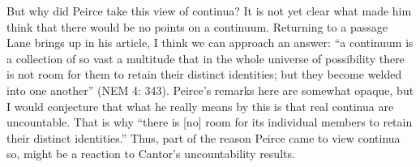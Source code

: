 But why did Peirce take this view of continua? It is not yet clear what made him think that there would be no points on a continuum. Returning to a passage Lane brings up in his article, I think we can approach an answer: ``a continuum is a collection of so vast a multitude that in the whole universe of possibility there is not room for them to retain their distinct identities; but they become welded into one another'' (NEM 4: 343). Peirce's remarks here are somewhat opaque, but I would conjecture that what he really means by this is that real continua are uncountable. That is why ``there is [no] room for its individual members to retain their distinct identities.'' Thus, part of the reason Peirce came to view continua so, might be a reaction to Cantor's uncountability results. 

